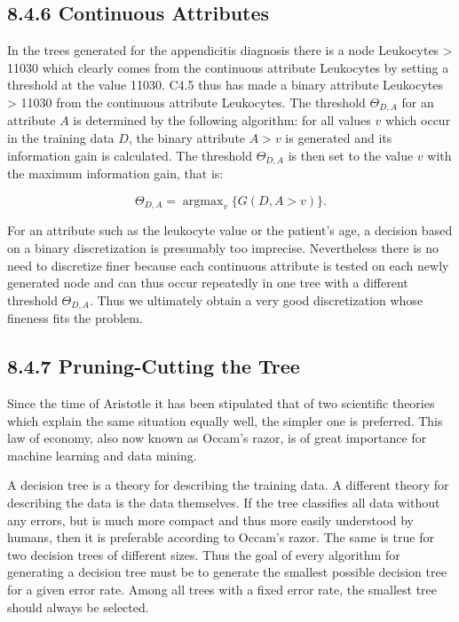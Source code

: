 \documentclass[10pt]{article}
\begin{document}
\subsection*{8.4.6 Continuous Attributes}
In the trees generated for the appendicitis diagnosis there is a node Leukocytes > 11030 which clearly comes from the continuous attribute Leukocytes by setting a threshold at the value 11030. C4.5 thus has made a binary attribute Leukocytes > 11030 from the continuous attribute Leukocytes. The threshold $\Theta_{D, A}$ for an attribute $A$ is determined by the following algorithm: for all values $v$ which occur in the training data $D$, the binary attribute $A>v$ is generated and its information gain is calculated. The threshold $\Theta_{D, A}$ is then set to the value $v$ with the maximum information gain, that is:

$$
\Theta_{D, A}=\operatorname{argmax}_{v}\{G(D, A>v)\} .
$$

For an attribute such as the leukocyte value or the patient's age, a decision based on a binary discretization is presumably too imprecise. Nevertheless there is no need to discretize finer because each continuous attribute is tested on each newly generated node and can thus occur repeatedly in one tree with a different threshold $\Theta_{D, A}$. Thus we ultimately obtain a very good discretization whose fineness fits the problem.

\subsection*{8.4.7 Pruning-Cutting the Tree}
Since the time of Aristotle it has been stipulated that of two scientific theories which explain the same situation equally well, the simpler one is preferred. This law of economy, also now known as Occam's razor, is of great importance for machine learning and data mining.


A decision tree is a theory for describing the training data. A different theory for describing the data is the data themselves. If the tree classifies all data without any errors, but is much more compact and thus more easily understood by humans, then it is preferable according to Occam's razor. The same is true for two decision trees of different sizes. Thus the goal of every algorithm for generating a decision tree must be to generate the smallest possible decision tree for a given error rate. Among all trees with a fixed error rate, the smallest tree should always be selected.
\end{document}

